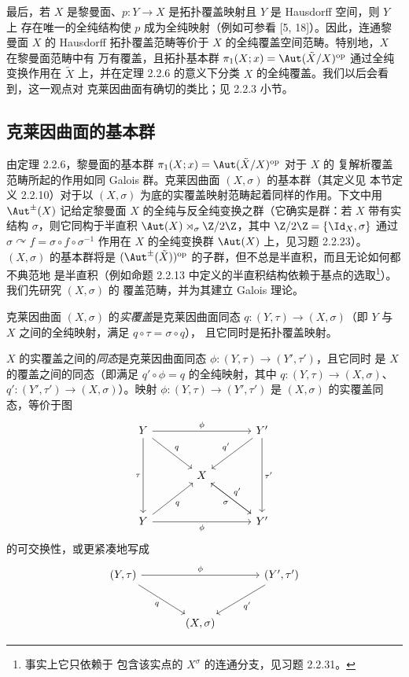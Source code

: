 最后，若 $X$ 是黎曼面、$p:Y\to X$ 是拓扑覆盖映射且 $Y$ 是 Hausdorff 空间，则 $Y$ 上
存在唯一的全纯结构使 $p$ 成为全纯映射（例如可参看 [5, 18]）。因此，连通黎曼面 $X$ 的
Hausdorff 拓扑覆盖范畴等价于 $X$ 的全纯覆盖空间范畴。特别地，$X$ 在黎曼面范畴中有
万有覆盖，且拓扑基本群 $\pi_1(X;x)=\Aut(\tilde X/X)^{\mathrm{op}}$ 通过全纯变换作用在
$\tilde X$ 上，并在定理 2.2.6 的意义下分类 $X$ 的全纯覆盖。我们以后会看到，这一观点对
克莱因曲面有确切的类比；见 2.2.3 小节。

\subsection{克莱因曲面的基本群}
\label{sec:02.2.2}

由定理 2.2.6，黎曼面的基本群 $\pi_1(X;x)=\Aut(\tilde X/X)^{\mathrm{op}}$ 对于 $X$ 的
复解析覆盖范畴所起的作用如同 Galois 群。克莱因曲面 $(X,\sigma)$ 的基本群（其定义见
本节定义 2.2.10）对于以 $(X,\sigma)$ 为底的实覆盖映射范畴起着同样的作用。下文中用
$\Aut^{\pm}(X)$ 记给定黎曼面 $X$ 的全纯与反全纯变换之群（它确实是群：若 $X$ 带有实
结构 $\sigma$，则它同构于半直积 $\Aut(X)\rtimes_\sigma\Z/2\Z$，其中
$\Z/2\Z=\{\Id_X,\sigma\}$ 通过 $\sigma\curvearrowright f=\sigma\circ f\circ\sigma^{-1}$
作用在 $X$ 的全纯变换群 $\Aut(X)$ 上，见习题 2.2.23）。$(X,\sigma)$ 的基本群将是
$(\Aut^{\pm}(\tilde X))^{\mathrm{op}}$ 的子群，但不总是半直积，而且无论如何都不典范地
是半直积（例如命题 2.2.13 中定义的半直积结构依赖于基点的选取\footnote{事实上它只依赖于
包含该实点的 $X^\sigma$ 的连通分支，见习题 2.2.31。}）。我们先研究 $(X,\sigma)$ 的
覆盖范畴，并为其建立 Galois 理论。

\begin{definition}[实覆盖及其同态]\label{def:2.2.7}
克莱因曲面 $(X,\sigma)$ 的\emph{实覆盖}是克莱因曲面同态
$q:(Y,\tau)\to(X,\sigma)$（即 $Y$ 与 $X$ 之间的全纯映射，满足 $q\circ\tau=\sigma\circ q$），
且它同时是拓扑覆盖映射。
\end{definition}

$X$ 的实覆盖之间的\emph{同态}是克莱因曲面同态 $\phi:(Y,\tau)\to(Y',\tau')$，且它同时
是 $X$ 的覆盖之间的同态（即满足 $q'\circ\phi=q$ 的全纯映射，其中
$q:(Y,\tau)\to(X,\sigma)$、$q':(Y',\tau')\to(X,\sigma)$）。映射
$\phi:(Y,\tau)\to(Y',\tau')$ 是 $(X,\sigma)$ 的实覆盖同态，等价于图
\[
\begin{tikzcd}[column sep=large, row sep=large]
Y \arrow[rr, "\phi"] \arrow[dd, "\tau"'] \arrow[dr, "q"] & & Y' \arrow[dd, "\tau'"] \arrow[dl, "q'"']\\
 & X \arrow[dr, "\sigma"'] & \\
 Y \arrow[rr, "\phi"'] \arrow[ur, "q"'] & & Y' \arrow[ul, "q'"']
\end{tikzcd}
\]
的可交换性，或更紧凑地写成
\[
\begin{tikzcd}[column sep=large, row sep=large]
(Y,\tau) \arrow[rr, "\phi"] \arrow[dr, "q"'] & & (Y',\tau') \arrow[dl, "q'"]\\
 & (X,\sigma) &
\end{tikzcd}
\]

